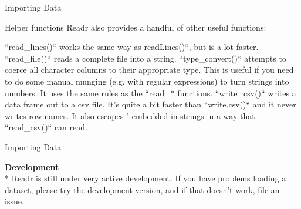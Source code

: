 
{Importing Data}


Helper functions
Readr also provides a handful of other useful functions:

``read_lines()`` works the same way as readLines()``, but is a lot faster.
``read_file()`` reads a complete file into a string.
``type_convert()`` attempts to coerce all character columns to their appropriate type. 
This is useful if you need to do some manual munging (e.g. with regular expressions) to turn strings into numbers. It uses the same rules as the ``read_* functions.
``write_csv()`` writes a data frame out to a csv file. It’s quite a bit faster than ``write.csv()`` and it never writes row.names. 
It also escapes " embedded in strings in a way that ``read_csv()`` can read.



{Importing Data}

\noindent \textbf{Development}\\

* Readr is still under very active development. If you have problems loading a dataset, please try the development version, and if that doesn’t work, file an issue.





